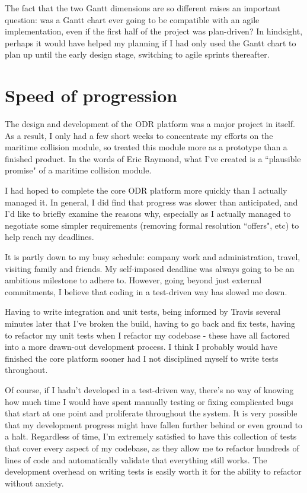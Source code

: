 The fact that the two Gantt dimensions are so different raises an important question: was a Gantt chart ever going to be compatible with an agile implementation, even if the first half of the project was plan-driven? In hindsight, perhaps it would have helped my planning if I had only used the Gantt chart to plan up until the early design stage, switching to agile sprints thereafter.

\section{Speed of progression}\label{section:speedOfProgression}

The design and development of the ODR platform was a major project in itself. As a result, I only had a few short weeks to concentrate my efforts on the maritime collision module, so treated this module more as a prototype than a finished product. In the words of Eric Raymond, what I've created is a ``plausible promise" of a maritime collision module.~\cite{eric:catB}

I had hoped to complete the core ODR platform more quickly than I actually managed it. In general, I did find that progress was slower than anticipated, and I'd like to briefly examine the reasons why, especially as I actually managed to negotiate some simpler requirements (removing formal resolution ``offers", etc) to help reach my deadlines.

It is partly down to my busy schedule: company work and administration, travel, visiting family and friends. My self-imposed deadline was always going to be an ambitious milestone to adhere to. However, going beyond just external commitments, I believe that coding in a test-driven way has slowed me down.

Having to write integration and unit tests, being informed by Travis several minutes later that I've broken the build, having to go back and fix tests, having to refactor my unit tests when I refactor my codebase - these have all factored into a more drawn-out development process. I think I probably would have finished the core platform sooner had I not disciplined myself to write tests throughout.

Of course, if I hadn't developed in a test-driven way, there's no way of knowing how much time I would have spent manually testing or fixing complicated bugs that start at one point and proliferate throughout the system. It is very possible that my development progress might have fallen further behind or even ground to a halt. Regardless of time, I'm extremely satisfied to have this collection of tests that cover every aspect of my codebase, as they allow me to refactor hundreds of lines of code and automatically validate that everything still works. The development overhead on writing tests is easily worth it for the ability to refactor without anxiety.

